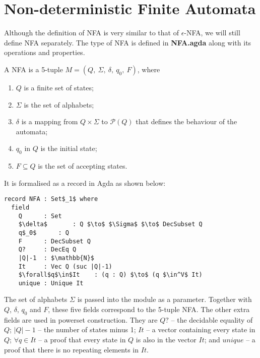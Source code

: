 \section{Non-deterministic Finite Automata}
\par Although the definition of NFA is very similar to that of
\(\epsilon\)-NFA, we will still define NFA
separately. The type of NFA is defined in \textbf{NFA.agda} along with
its operations and properties. 

\begin{defn}
\noindent A NFA is a 5-tuple \(M = (Q
,\ \Sigma,\ \delta,\ q_0,\ F)\), where
\begin{enumerate}[nolistsep]
  \item \(Q\) is a finite set of states;
  \item \(\Sigma\) is the set of alphabets;
  \item \(\delta\) is a mapping from \(Q \times \Sigma\) to
    \(\mathcal P \left({Q}\right)\) that defines the behaviour of the automata;
  \item \(q_0\) in \(Q\) is the initial state;
  \item \(F \subseteq Q\) is the set of accepting states. 
\end{enumerate}
\end{defn}

\par It is formalised as a record in Agda as shown below: 

\begin{lstlisting}[mathescape=true,xleftmargin=.3\textwidth]
record NFA : Set$_1$ where
  field
    Q      : Set
    $\delta$       : Q $\to$ $\Sigma$ $\to$ DecSubset Q
    q$_0$      : Q
    F      : DecSubset Q
    Q?     : DecEq Q
    |Q|-1  : $\mathbb{N}$
    It     : Vec Q (suc |Q|-1)
    $\forall$q$\in$It    : (q : Q) $\to$ (q $\in^V$ It)
    unique : Unique It
\end{lstlisting}

\par The set of alphabets \(\Sigma\) is passed into the module as a
parameter. Together with \(Q\), \(\delta\),
\(q_0\) and \(F\), these five fields correspond to the 5-tuple
NFA. The other extra fields are used in powerset construction. They
are \(Q?\) -- the decidable equality of \(Q\);
\(|Q|-1\) -- the number of states minus 1; \(It\) -- a vector containing every state in \(Q\); \(\forall q\in It\)
-- a proof that every state in \(Q\) is also in the vector
\(It\); and \(unique\) -- a proof that there is no repeating elements in
\(It\). 

